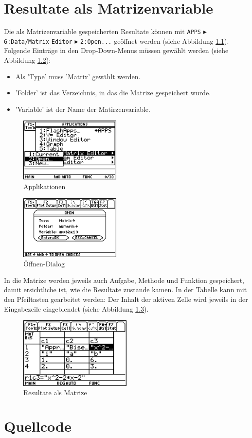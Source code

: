 \documentclass[a4paper,10pt]{scrreprt}
\begin{document}
\chapter{Resultate als Matrizenvariable}
Die als Matrizenvariable gespeicherten Resultate k\"onnen mit \verb|APPS| $\blacktriangleright$ \verb|6:Data/Matrix| \verb|Editor| $\blacktriangleright$ \verb|2:Open...| ge\"offnet werden (siehe Abbildung \ref{fig:Applications}). Folgende Eintr\"age in den Drop-Down-Menus m\"ussen gew\"ahlt werden (siehe Abbildung \ref{fig:Open}):
\begin{itemize}
  \item Als 'Type' muss 'Matrix' gew\"ahlt werden.
  \item 'Folder' ist das Verzeichnis, in das die Matrize gespeichert wurde.
  \item 'Variable' ist der Name der Matirzenvariable.
\end{itemize}
\begin{figure}[h]
  \centering
  \includegraphics[width=0.45\textwidth]{img/nummeth_image050.png}
  \caption{Applikationen}
  \label{fig:Applications}
\end{figure}
\begin{figure}[h]
  \centering
  \includegraphics[width=0.45\textwidth]{img/nummeth_image052.png}
  \caption{\"Offnen-Dialog}
  \label{fig:Open}
\end{figure}

\newpage
In die Matrize werden jeweils auch Aufgabe, Methode und Funktion gespeichert, damit ersichtliche ist, wie die Resultate zustande kamen. In der Tabelle kann mit den Pfeiltasten gearbeitet werden: Der Inhalt der aktiven Zelle wird jeweils in der Eingabezeile eingeblendet (siehe Abbildung \ref{fig:Matrix}).
\begin{figure}[h]
  \centering
  \includegraphics[width=0.5\textwidth]{img/nummeth_image054.png}
  \caption{Resultate als Matrize}
  \label{fig:Matrix}
\end{figure}

\listoffigures
\let\clearpage\relax

\endgroup

\appendix
\chapter{Quellcode}

 
\end{document}

